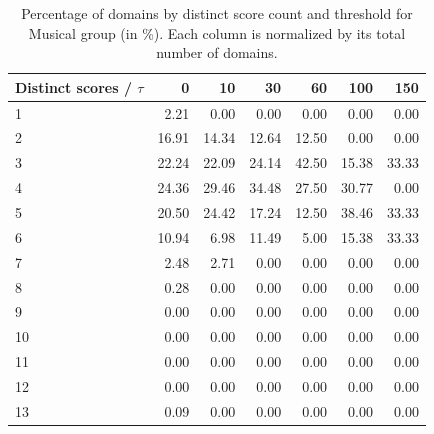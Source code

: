 \begin{table}[htbp]
\centering
\small
\begin{tabular}{l r r r r r r}
\hline
Distinct scores / $\tau$ & 0 & 10 & 30 & 60 & 100 & 150 \\
\hline
1 & 2.21 & 0.00 & 0.00 & 0.00 & 0.00 & 0.00 \\
2 & 16.91 & 14.34 & 12.64 & 12.50 & 0.00 & 0.00 \\
3 & 22.24 & 22.09 & 24.14 & 42.50 & 15.38 & 33.33 \\
4 & 24.36 & 29.46 & 34.48 & 27.50 & 30.77 & 0.00 \\
5 & 20.50 & 24.42 & 17.24 & 12.50 & 38.46 & 33.33 \\
6 & 10.94 & 6.98 & 11.49 & 5.00 & 15.38 & 33.33 \\
7 & 2.48 & 2.71 & 0.00 & 0.00 & 0.00 & 0.00 \\
8 & 0.28 & 0.00 & 0.00 & 0.00 & 0.00 & 0.00 \\
9 & 0.00 & 0.00 & 0.00 & 0.00 & 0.00 & 0.00 \\
10 & 0.00 & 0.00 & 0.00 & 0.00 & 0.00 & 0.00 \\
11 & 0.00 & 0.00 & 0.00 & 0.00 & 0.00 & 0.00 \\
12 & 0.00 & 0.00 & 0.00 & 0.00 & 0.00 & 0.00 \\
13 & 0.09 & 0.00 & 0.00 & 0.00 & 0.00 & 0.00 \\
\hline
\end{tabular}
\caption{Percentage of domains by distinct score count and threshold for Musical group (in \%). Each column is normalized by its total number of domains.}
\label{tab:distinct-scores-percentages-Musical-group}
\end{table}
